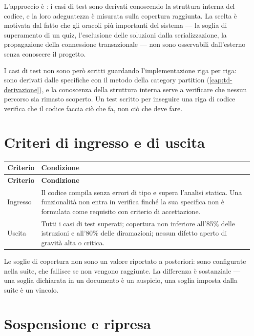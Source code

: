 L'approccio è : i casi di test sono derivati conoscendo la
struttura interna del codice, e la loro adeguatezza è misurata sulla
copertura raggiunta. La scelta è motivata dal fatto che gli oracoli più
importanti del sistema — la soglia di superamento di un quiz, l'esclusione
delle soluzioni dalla serializzazione, la propagazione della connessione
transazionale — non sono osservabili dall'esterno senza conoscere il
progetto.

I casi di test non sono però scritti guardando l'implementazione riga per
riga: sono derivati dalle specifiche con il metodo della category partition
(\cref{cap:td-derivazione}), e la conoscenza della struttura interna serve a
verificare che nessun percorso sia rimasto scoperto. Un test scritto per
inseguire una riga di codice verifica che il codice faccia ciò che fa, non
ciò che deve fare.

\section{Criteri di ingresso e di uscita}

\begin{longtable}{@{}L{4.0cm} L{10.4cm}@{}}
\toprule
\textbf{Criterio} & \textbf{Condizione} \\
\midrule
\endfirsthead
\toprule
\textbf{Criterio} & \textbf{Condizione} \\
\midrule
\endhead
\bottomrule
\endlastfoot

Ingresso &
Il codice compila senza errori di tipo e supera l'analisi statica. Una
funzionalità non entra in verifica finché la sua specifica non è formulata
come requisito con criterio di accettazione. \\

Uscita &
Tutti i casi di test superati; copertura non inferiore all'85\% delle
istruzioni e all'80\% delle diramazioni; nessun difetto aperto di gravità
alta o critica. \\

\end{longtable}

Le soglie di copertura non sono un valore riportato a posteriori: sono
configurate nella suite, che fallisce se non vengono raggiunte. La differenza
è sostanziale — una soglia dichiarata in un documento è un auspicio, una
soglia imposta dalla suite è un vincolo.

\section{Sospensione e ripresa}

